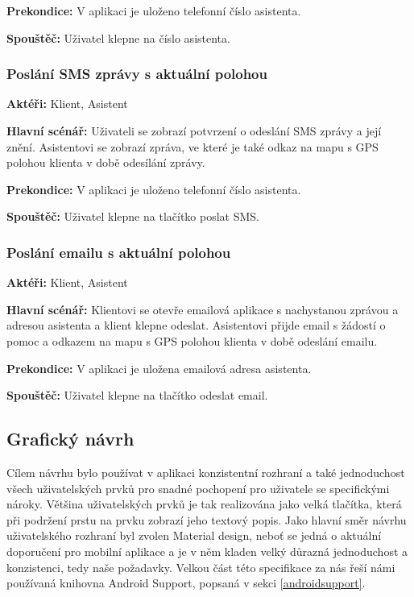 \documentclass[czech,master,public,dept460,male,java,cpdeclaration]{diploma}
\newcommand{\usecase}[2]{\subsubsection{#1}\label{#2}}
\begin{document}
\vspace{0.1cm}
\noindent
\textbf{Prekondice:} V aplikaci je uloženo telefonní číslo asistenta.

\vspace{0.1cm}
\noindent
\textbf{Spouštěč:} Uživatel klepne na číslo asistenta.

\usecase{Poslání SMS zprávy s aktuální polohou}{pomocsms}
\textbf{Aktéři:} Klient, Asistent

\vspace{0.1cm}
\noindent
\textbf{Hlavní scénář:} Uživateli se zobrazí potvrzení o odeslání SMS zprávy a její znění.
Asistentovi se zobrazí zpráva, ve které je také odkaz na mapu s GPS polohou klienta v době odesílání zprávy.

\vspace{0.1cm}
\noindent
\textbf{Prekondice:} V aplikaci je uloženo telefonní číslo asistenta.

\vspace{0.1cm}
\noindent
\textbf{Spouštěč:} Uživatel klepne na tlačítko poslat SMS.


\usecase{Poslání emailu s aktuální polohou}{pomocemail}
\textbf{Aktéři:} Klient, Asistent

\vspace{0.1cm}
\noindent
\textbf{Hlavní scénář:} Klientovi se otevře emailová aplikace s nachystanou zprávou a adresou asistenta
a klient klepne odeslat. Asistentovi přijde email s žádostí o pomoc a odkazem na mapu s GPS polohou
klienta v době odeslání emailu.

\vspace{0.1cm}
\noindent
\textbf{Prekondice:} V aplikaci je uložena emailová adresa asistenta.

\vspace{0.1cm}
\noindent
\textbf{Spouštěč:} Uživatel klepne na tlačítko odeslat email.

\subsection{Grafický návrh}
Cílem návrhu bylo používat v aplikaci konzistentní rozhraní a také jednoduchost všech uživatelských
prvků pro snadné pochopení pro uživatele se specifickými nároky. Většina uživatelských prvků je tak
realizována jako velká tlačítka, která při podržení prstu na prvku zobrazí jeho textový popis.
Jako hlavní směr návrhu uživatelského rozhraní byl zvolen Material design, neboť se jedná o aktuální
doporučení pro mobilní aplikace a je v něm kladen velký důrazná jednoduchost a konzistenci,
tedy naše požadavky. Velkou část této specifikace za nás řeší námi používaná knihovna Android Support,
popsaná v sekci \ref{androidsupport}.
\end{document}
